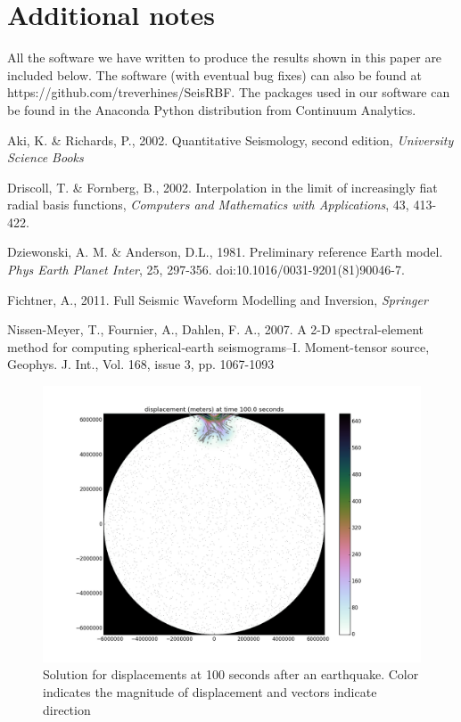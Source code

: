 \documentclass[12pt]{article}
\begin{document}
\section*{Additional notes}
All the software we have written to produce the results shown in this
paper are included below.  The software (with eventual bug fixes) can
also be found at https://github.com/treverhines/SeisRBF.  The packages
used in our software can be found in the Anaconda Python distribution
from Continuum Analytics.

\begin{thebibliography}{}
   Aki, K. \& Richards, P.,
    2002. Quantitative Seismology, second edition, \textit{University
      Science Books}


   Driscoll, T. \& Fornberg, B.,
    2002. Interpolation in the limit of increasingly fiat radial basis
    functions, \textit{Computers and Mathematics with Applications},
    43, 413-422.

   Dziewonski, A. M. \&
    Anderson, D.L., 1981. Preliminary reference Earth
    model. \textit{Phys Earth Planet Inter}, 25,
    297-356. doi:10.1016/0031-9201(81)90046-7.

   Fichtner, A., 2011. Full Seismic
    Waveform Modelling and Inversion, \textit{Springer}
 
   Nissen-Meyer, T.,
    Fournier, A., Dahlen, F. A., 2007. A 2-D spectral-element method
    for computing spherical-earth seismograms--I. Moment-tensor
    source, Geophys. J. Int., Vol. 168, issue 3, pp. 1067-1093
\end{thebibliography}

\begin{figure}
\includegraphics[scale=0.4]{figures/100s}
\centering
\caption{Solution for displacements at 100 seconds after an earthquake. Color
  indicates the magnitude of displacement and vectors indicate
  direction}
\end{figure}
\end{document}
